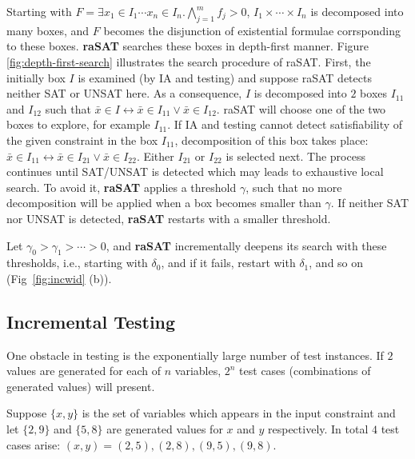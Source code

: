 Starting with $F = \exists x_1 \in I_1 \cdots x_n \in I_n. \bigwedge \limits_{j=1}^m f_j > 0$, 
$I_1 \times \cdots \times I_n$ is decomposed into many boxes, 
and $F$ becomes the disjunction of existential formulae corrsponding to these boxes. 
{\bf raSAT} searches these boxes in depth-first manner. Figure \ref{fig:depth-first-search} illustrates the search procedure of raSAT. First, the initially box $I$ is examined (by IA and testing) and suppose raSAT detects neither SAT or UNSAT here. As a consequence, $I$ is decomposed into $2$ boxes $I_{11}$ and $I_{12}$ such that $\bar{x} \in I \leftrightarrow \bar{x} \in I_{11} \vee \bar{x} \in I_{12}$. raSAT will choose one of the two boxes to explore, for example $I_{11}$. If IA and testing cannot detect satisfiability of the given constraint in the box $I_{11}$, decomposition of this box takes place:  $\bar{x} \in I_{11} \leftrightarrow \bar{x} \in I_{21} \vee \bar{x} \in I_{22}$. Either $I_{21}$ or $I_{22}$ is selected next. The process continues until SAT/UNSAT is detected which may leads to exhaustive local search.
To avoid it, {\bf raSAT} applies a threshold $\gamma$, such that no more decomposition will be 
applied when a box becomes smaller than $\gamma$. 
If neither SAT nor UNSAT is detected, {\bf raSAT} restarts with a smaller threshold. 

Let $\gamma_0 > \gamma_1 > \cdots > 0$, and {\bf raSAT} incrementally deepens its search 
with these thresholds, i.e., starting with $\delta_0$, and if it fails, restart with $\delta_1$, 
and so on (Fig~\ref{fig:incwid} (b)). 

\begin{comment}

\begin{figure}[ht]
\centering
\texttt{[image: depth-first-search.jpg]} 
\caption{\textbf{raSAT} design} 
\label{fig:depth-first-search} 
\end{figure} 
\end{comment}
\subsection{Incremental Testing}
One obstacle in testing is the exponentially large number of test instances. If $2$ values are generated for each of $n$ variables, $2^n$ test cases (combinations of generated values) will present. 
\begin{example}
Suppose $\{x, y\}$ is the set of variables which appears in the input constraint and let $\{2, 9\}$ and $\{5, 8\}$ are generated values for $x$ and $y$ respectively. In total $4$ test cases arise: $(x, y) = (2, 5), (2, 8), (9, 5), (9, 8)$.
\end{example}

